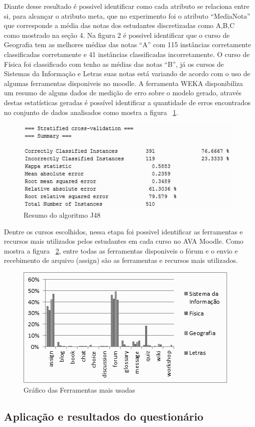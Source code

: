 \documentclass[12pt]{article}
\begin{document}
Diante desse resultado é possivel identificar como cada atributo se relaciona entre si, para alcançar o atributo meta, que no experimento foi o atributo ``MediaNota'' que corresponde a média das notas dos estudantes discretizadas como A,B,C como mostrado na seção 4. Na figura 2 é possivel identificar que o curso de Geografia tem as melhores médias das notas ``A'' com 115 instâncias corretamente classificadas corretamente e 41 instâncias classificadas incorretamente. O curso de Física foi classificado com tenho as médias das notas ``B'', já os cursos de Sistemas da Informação e Letras suas notas está variando de acordo com o uso de algumas ferramentas disponiveis no moodle. A ferramenta WEKA disponibiliza um resumo de alguns dados de medição de erro sobre o modelo gerado, através destas estatísticas geradas é possível identificar a quantidade de erros encontrados no conjunto de dados analisados como mostra a figura ~\ref{fig:ResumoJ48}.
\begin{figure}[ht]
\centering
\includegraphics[width=.5\textwidth]{ResumoJ48.jpg}
\caption{Resumo do algoritmo J48}
\label{fig:ResumoJ48}
\end{figure}
Dentre os cursos escolhidos, nessa etapa foi possivel identificar as ferramentas e recursos mais utilizados pelos estudantes em cada curso no AVA Moodle. Como mostra a figura ~\ref{fig:MaisUsadas}, entre todas as ferramentas disponiveis o fórum e o envio e recebimento de arquivo (assign) são as ferramentas e recursos mais utilizados. 
\begin{figure}[ht]
\centering
\includegraphics[width=.5\textwidth]{MaisUsadas.jpg}
\caption{Gráfico das Ferramentas mais usadas}
\label{fig:MaisUsadas}
\end{figure}

\subsection{Aplicação e resultados do questionário}
\end{document}
